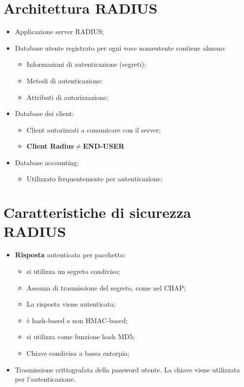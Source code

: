 \documentclass{book}
\theoremstyle{remark}
\begin{document}
\section{Architettura RADIUS}
\begin{itemize}
	\item Applicazione server RADIUS;\@
	\item Database utente registrato per ogni voce nomeutente contiene almeno:\begin{itemize}
		      \item Informazioni di autenticazione (segreti);\@
		      \item Metodi di autenticazione:
		      \item Attributi di autorizzazione;\@
	      \end{itemize}
	\item Database dei client:\begin{itemize}
		      \item Client autorizzati a comunicare con il server;\@
		      \item \textbf{Client Radius}\(\neq\)\textbf{END-USER}

	      \end{itemize}
	\item Database accounting:\begin{itemize}
		      \item Utilizzato frequentemente per autenticazione;\@
	      \end{itemize}
\end{itemize}
\section{Caratteristiche di sicurezza RADIUS}
\begin{itemize}
	\item \textbf{Risposta} autenticata per pacchetto:\begin{itemize}
		      \item si utilizza un segreto condiviso;\@
		      \item Assenza di trasmissione del segreto, come nel CHAP;\@
		      \item La risposta viene autenticata;\@
		      \item è hash-based e non HMAC-based;\@
		      \item si utilizza come funzione hash MD5;\@
		      \item Chiave condivisa a bassa entorpia;\@
	      \end{itemize}
	\item Trasmissione crittografata della password utente\@. La chiave viene utilizzata per l'autenticazione\@.
\end{itemize}
\end{document}
